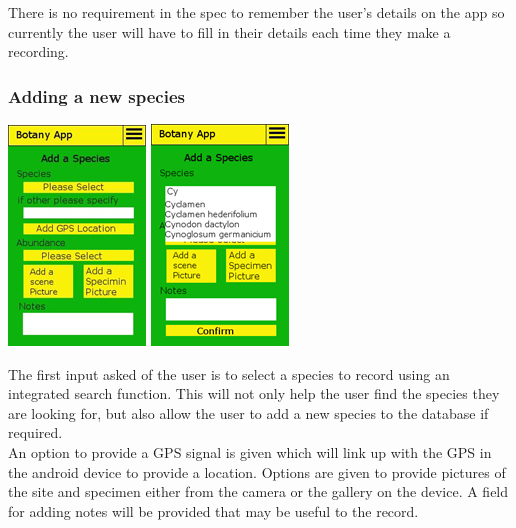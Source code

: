 		There is no requirement in the spec to remember the user’s details on the app so currently the user will have to fill in their details each time they make a recording.\\
		
	\subsubsection{Adding a new species}
		\begin{center}
			\includegraphics[scale=1]{uiDesign/botanyAppAddSpecies1.png}
			\includegraphics[scale=1]{uiDesign/botanyAppAddSpecies2.png}
		\end{center}
		The first input asked of the user is to select a species to record using an integrated search function. This will not only help the user find the species they are looking for, but also allow the user to add a new species to the database if required.\\
		
		An option to provide a GPS signal is given which will link up with the GPS in the android device to provide a location. Options are given to provide pictures of the site and specimen either from the camera or the gallery on the device. A field for adding notes will be provided that may be useful to the record.\\
	
